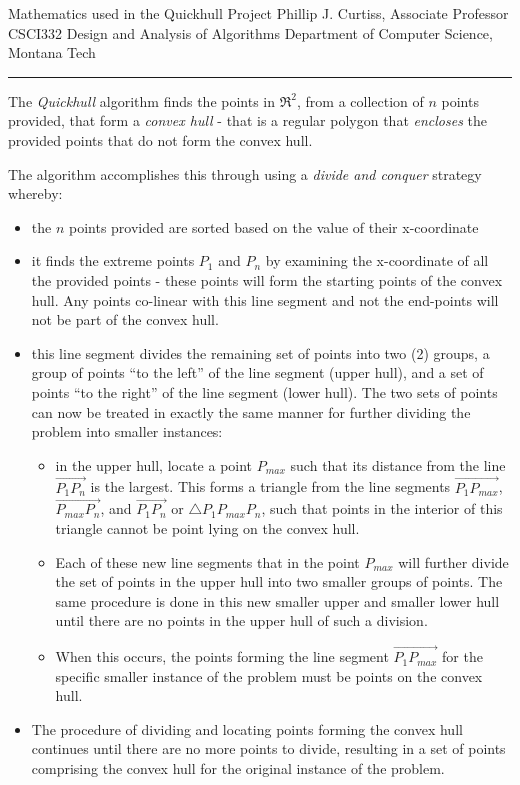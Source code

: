 \documentclass[letterpaper,10pt,english]{article}
\begin{document}
\begin{flushleft}
  Mathematics used in the Quickhull Project \hfill Phillip J. Curtiss, Associate Professor\\
  CSCI332 Design and Analysis of Algorithms \hfill Department of Computer Science, Montana Tech \\[1em]
  \hrule
\end{flushleft}

The \emph{Quickhull} algorithm finds the points in $\Re^{2}$, from a collection of $n$ points provided, that form a \emph{convex hull} - that is a regular polygon that \emph{encloses} the provided points that do not form the convex hull. 

The algorithm accomplishes this through using a \emph{divide and conquer} strategy whereby: 

\begin{itemize}
  \item the $n$ points provided are sorted based on the value of their x-coordinate
  \item it finds the extreme points $P_{1}$ and $P_{n}$ by examining the x-coordinate of all the provided points - these points will form the starting points of the convex hull. Any points co-linear with this line segment and not the end-points will not be part of the convex hull. 
  \item this line segment divides the remaining set of points into two (2) groups, a group of points ``to the left'' of the line segment (upper hull), and a set of points ``to the right'' of the line segment (lower hull). The two sets of points can now be treated in exactly the same manner for further dividing the problem into smaller instances:
  \begin{itemize}
    \item in the upper hull, locate a point $P_{max}$ such that its distance from the line $\overrightarrow{P_{1}P_{n}}$ is the largest. This forms a triangle from the line segments $\overrightarrow{P_{1}P_{max}}$, $\overrightarrow{P_{max}P_{n}}$, and $\overrightarrow{P_{1}P_{n}}$ or $\triangle P_{1}P_{max}P_{n}$, such that points in the interior of this triangle cannot be point lying on the convex hull.
    \item Each of these new line segments that in the point $P_{max}$ will further divide the set of points in the upper hull into two smaller groups of points. The same procedure is done in this new smaller upper and smaller lower hull until there are no points in the upper hull of such a division. 
    \item When this occurs, the points forming the line segment $\overrightarrow{P_{1}P_{max}}$ for the specific smaller instance of the problem must be points on the convex hull. 
  \end{itemize}
  \item The procedure of dividing and locating points forming the convex hull continues until there are no more points to divide, resulting in a set of points comprising the convex hull for the original instance of the problem. 
\end{itemize}
\end{document}
